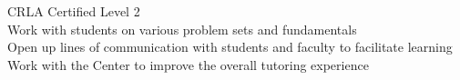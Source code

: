 \documentclass{res}
\begin{document}
\begin{resume}
	 CRLA Certified Level 2\\
	 Work with students on various problem sets and fundamentals\\
	 Open up lines of communication with students and faculty to facilitate learning\\
	 Work with the Center to improve the overall tutoring experience\\
	\vspace{-12pt}

 

\end{resume}
\end{document}
